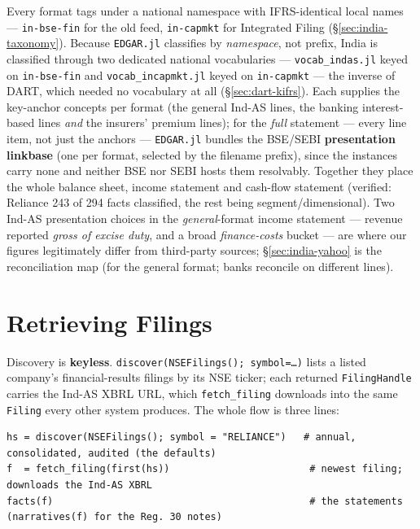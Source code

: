 \documentclass[11pt,a4paper]{report}
\begin{document}
\medskip\noindent Every format tags under a national namespace with IFRS-identical local names ---
\texttt{in-bse-fin} for the old feed, \texttt{in-capmkt} for Integrated Filing (\S\ref{sec:india-taxonomy}).
Because \texttt{EDGAR.jl} classifies by \emph{namespace}, not prefix, India is classified through two
dedicated national vocabularies --- \texttt{vocab\_indas.jl} keyed on \texttt{in-bse-fin} and
\texttt{vocab\_incapmkt.jl} keyed on \texttt{in-capmkt} --- the inverse of DART, which needed no vocabulary
at all (\S\ref{sec:dart-kifrs}). Each supplies the key-anchor concepts per format (the general Ind-AS lines,
the banking interest-based lines \emph{and} the insurers' premium lines); for the \emph{full} statement ---
every line item, not just the anchors --- \texttt{EDGAR.jl} bundles the BSE/SEBI \textbf{presentation
linkbase} (one per format, selected by the filename prefix), since the instances carry none and neither BSE
nor SEBI hosts them resolvably. Together they place the whole balance sheet, income statement and cash-flow
statement (verified: Reliance 243 of 294 facts classified, the rest being segment/dimensional). Two Ind-AS
presentation choices in the \emph{general}-format income statement --- revenue reported \emph{gross of
excise duty}, and a broad \emph{finance-costs} bucket --- are where our figures legitimately differ from
third-party sources; \S\ref{sec:india-yahoo} is the reconciliation map (for the general format; banks reconcile on
different lines).

\section{Retrieving Filings}\label{sec:india-retrieve}

Discovery is \textbf{keyless}. \texttt{discover(NSEFilings();\ symbol=\ldots)} lists a listed company's
financial-results filings by its NSE ticker; each returned \texttt{FilingHandle} carries the Ind-AS XBRL URL,
which \texttt{fetch\_filing} downloads into the same \texttt{Filing} every other system produces. The whole
flow is three lines:

\begin{lstlisting}
hs = discover(NSEFilings(); symbol = "RELIANCE")   # annual, consolidated, audited (the defaults)
f  = fetch_filing(first(hs))                        # newest filing; downloads the Ind-AS XBRL
facts(f)                                            # the statements  (narratives(f) for the Reg. 30 notes)
\end{lstlisting}
\end{document}
